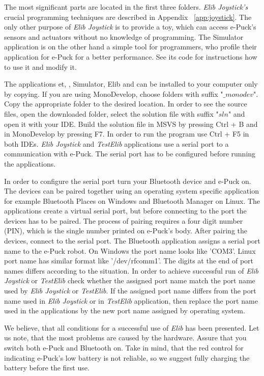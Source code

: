   The most significant parts are located in the first three folders.
  {\it Elib Joystick's} crucial programming techniques are described 
  in Appendix ~\ref{app:joystick}.
  The only other purpose of {\it Elib Joystick} is to provide a toy, 
  which can access e-Puck's sensors and actuators without no knowledge of programming.
  The Simulator application is on the other hand a simple tool for programmers, 
  who profile their application for e-Puck for a better performance.
  See its code for instructions how to use it and modify it.

  The applications {\sf et}, {}, {\sf Simulator}, 
  {\sf Elib} and {}
  can be installed to your computer only by copying.
  If you are using MonoDevelop, choose folders with suffix "$\_monodev$". 
  Copy the appropriate folder to the desired location.
  In order to see the source files, open the downloaded folder, 
  select the solution file with suffix "$sln$" and open it with your IDE.
  Build the solution file in MSVS by pressing Ctrl + B and in MonoDevelop by pressing F7. 
  In order to run the program use Ctrl + F5 in both IDEs.
  {\it Elib Joystick} and {\it TestElib} applications use 
  a serial port to a communication with e-Puck. 
  The serial port has to be configured before running the applications.

  In order to configure the serial port turn your Bluetooth device and e-Puck on. 
  The devices can be paired together using an operating system specific application 
  for example Bluetooth Places on Windows and Bluetooth Manager on Linux. 
  The applications create a virtual serial port, but before connecting to the port
  the devices has to be paired.
  The process of pairing requires a four digit number (PIN), 
  which is the single number printed on e-Puck's body.
  After pairing the devices, connect to the serial port.
  The Bluetooth application assigns a serial port name to the e-Puck robot. 
  On Windows the port name looks like 'COM3'. 
  Linux port name has similar format like '/dev/rfcomm1'.
  The digits at the end of port names differs according to the situation.
  In order to achieve successful run of {\it Elib Joystick} or {\it TestElib} check
  whether the assigned port name match the port name used by {\it Elib Joystick} or {\it TestElib}.
  If the assigned port name differs from the port name used in {\it Elib Joystick}
  or in {\it TestElib} application, then replace the port name used in the applications by
  the new port name assigned by operating system.

  We believe, that all conditions for a successful use  of {\it Elib} has been presented. 
  Let us note, that the most problems are caused by the hardware.
  Assure that you switch both e-Puck and Bluetooth on. Take in mind, 
  that the red control for indicating e-Puck's low battery is not reliable,
  so we suggest fully charging the battery before the first use.

